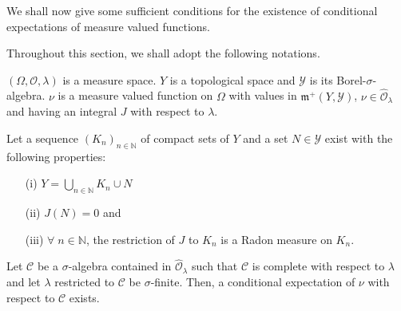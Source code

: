 We shall now give some sufficient conditions for the existence of
conditional expectations of measure valued functions. 

Throughout this section, we shall adopt the following notations. 

$(\Omega, \mathscr{O}, \lambda)$ is a measure space. $Y$ is a
topological space and $\mathscr{Y}$ is its
Borel-$\sigma$-algebra. $\nu$ is a measure valued function on $\Omega$
with values in $\mathfrak{m}^+(Y, \mathscr{Y})$, $\nu \in
\hat{\mathscr{O}}_\lambda$ and having an integral $J$ with respect to
$\lambda$. 

\begin{thm}\label{part1:chap3:thm38}
Let a sequence $(K_n)_{n \in\mathbb{N}}$ of compact sets of $Y$ and a
set $N\in \mathscr{Y}$ exist with the following properties:
\begin{itemize}
\item[{\rm (i)}] $Y = \bigcup\limits_{n \in \mathbb{N}} K_n \cup N$

\item[{\rm (ii)}] $J(N) = 0$ \pageoriginale and 


\item[{\rm (iii)}] $\forall \; n \in \mathbb{N}$, the restriction of
  $J$ to $K_n$ is a Radon measure on $K_n$. 
\end{itemize}

Let $\mathscr{C}$ be a $\sigma$-algebra contained in
$\hat{\mathscr{O}}_\lambda$ such that $\mathscr{C}$ is complete with
respect to $\lambda$ and let $\lambda$ restricted to $\mathscr{C}$ be
$\sigma$-finite. Then, a conditional expectation of $\nu$ with respect
to $\mathscr{C}$ exists. 
\end{thm}


